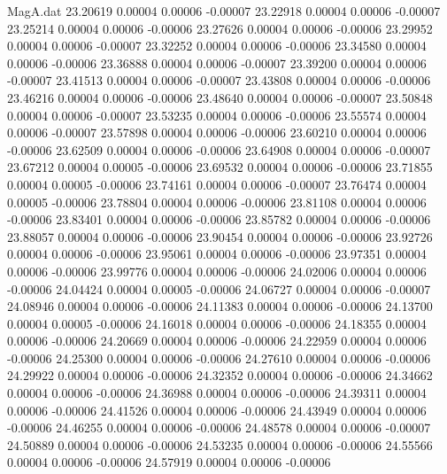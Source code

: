 \begin{filecontents}{MagA.dat}
  23.20619    0.00004    0.00006   -0.00007
  23.22918    0.00004    0.00006   -0.00007
  23.25214    0.00004    0.00006   -0.00006
  23.27626    0.00004    0.00006   -0.00006
  23.29952    0.00004    0.00006   -0.00007
  23.32252    0.00004    0.00006   -0.00006
  23.34580    0.00004    0.00006   -0.00006
  23.36888    0.00004    0.00006   -0.00007
  23.39200    0.00004    0.00006   -0.00007
  23.41513    0.00004    0.00006   -0.00007
  23.43808    0.00004    0.00006   -0.00006
  23.46216    0.00004    0.00006   -0.00006
  23.48640    0.00004    0.00006   -0.00007
  23.50848    0.00004    0.00006   -0.00007
  23.53235    0.00004    0.00006   -0.00006
  23.55574    0.00004    0.00006   -0.00007
  23.57898    0.00004    0.00006   -0.00006
  23.60210    0.00004    0.00006   -0.00006
  23.62509    0.00004    0.00006   -0.00006
  23.64908    0.00004    0.00006   -0.00007
  23.67212    0.00004    0.00005   -0.00006
  23.69532    0.00004    0.00006   -0.00006
  23.71855    0.00004    0.00005   -0.00006
  23.74161    0.00004    0.00006   -0.00007
  23.76474    0.00004    0.00005   -0.00006
  23.78804    0.00004    0.00006   -0.00006
  23.81108    0.00004    0.00006   -0.00006
  23.83401    0.00004    0.00006   -0.00006
  23.85782    0.00004    0.00006   -0.00006
  23.88057    0.00004    0.00006   -0.00006
  23.90454    0.00004    0.00006   -0.00006
  23.92726    0.00004    0.00006   -0.00006
  23.95061    0.00004    0.00006   -0.00006
  23.97351    0.00004    0.00006   -0.00006
  23.99776    0.00004    0.00006   -0.00006
  24.02006    0.00004    0.00006   -0.00006
  24.04424    0.00004    0.00005   -0.00006
  24.06727    0.00004    0.00006   -0.00007
  24.08946    0.00004    0.00006   -0.00006
  24.11383    0.00004    0.00006   -0.00006
  24.13700    0.00004    0.00005   -0.00006
  24.16018    0.00004    0.00006   -0.00006
  24.18355    0.00004    0.00006   -0.00006
  24.20669    0.00004    0.00006   -0.00006
  24.22959    0.00004    0.00006   -0.00006
  24.25300    0.00004    0.00006   -0.00006
  24.27610    0.00004    0.00006   -0.00006
  24.29922    0.00004    0.00006   -0.00006
  24.32352    0.00004    0.00006   -0.00006
  24.34662    0.00004    0.00006   -0.00006
  24.36988    0.00004    0.00006   -0.00006
  24.39311    0.00004    0.00006   -0.00006
  24.41526    0.00004    0.00006   -0.00006
  24.43949    0.00004    0.00006   -0.00006
  24.46255    0.00004    0.00006   -0.00006
  24.48578    0.00004    0.00006   -0.00007
  24.50889    0.00004    0.00006   -0.00006
  24.53235    0.00004    0.00006   -0.00006
  24.55566    0.00004    0.00006   -0.00006
  24.57919    0.00004    0.00006   -0.00006

\end{filecontents}
